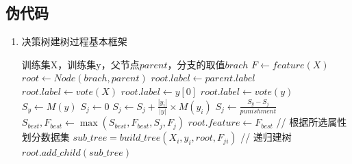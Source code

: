 \documentclass[UTF8,a4paper,12pt]{article}
\begin{document}
\subsection{伪代码}
\begin{enumerate}[itemindent=0.5em,label=\arabic*、]
  \item 决策树建树过程基本框架
  \begin{algorithm}
        \begin{algorithmic}[1] %
            \Require 训练集X，训练集y，父节点$parent$，分支的取值$brach$
                \State $F \gets feature(X)$
                \State $root \gets Node(brach, parent)$
                  \State $root.label \gets parent.label$
                  \State $root.label \gets vote(X)$
                  \State $root.label \gets y[0]$
                \Else
                \State $root.label \gets vote(y)$
                \State $S_y \gets M(y)$
                  \State $S_j \gets 0$
                    \State $S_j \gets S_j + \frac{|y_i|}{|y|} \times M(y_i)$
                  \EndFor
                  \State $S_j \gets \frac{S_y - S_j}{punishment}$
                  \State $S_{best}, F_{best} \gets \max(S_{best}, F_{best}, S_j, F_j)$
                \EndFor
                \State $root.feature \gets F_{best}$
                \State // 根据所选属性划分数据集
                  \State $sub\_tree = build\_tree(X_i, y_i, root, F_{ji})$ // 递归建树
                  \State $root.add\_child(sub\_tree)$
                \EndFor
                \EndIf
                \State {}
            \EndFunction
        \end{algorithmic}
    \end{algorithm}
\end{enumerate}

\newpage
\end{document}
